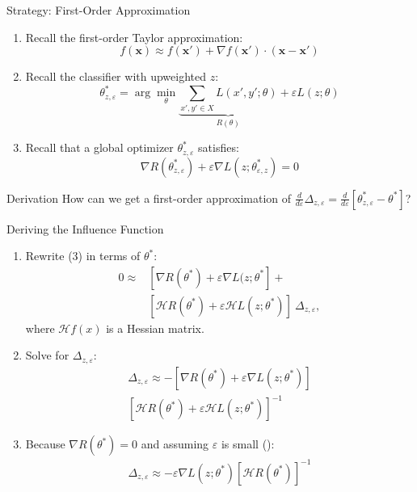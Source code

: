 \documentclass[10pt]{beamer}
\newcommand{\hessian}{\mathcal{H}\xspace}
\begin{document}
\begin{frame}[fragile]{Strategy: First-Order Approximation}

  \begin{enumerate}[<+-| alert@+>]
    \item Recall the first-order Taylor approximation:
      \[
        f(\mathbf{x}) \approx f(\mathbf{x}') + \nabla f(\mathbf{x}') \cdot (\mathbf{x} - \mathbf{x'})
      \]
    \item Recall the classifier with upweighted $z$:
      \[
        \theta^*_{z, \varepsilon} = \arg \min_\theta \underbrace{\sum_{x', y' \in X} L(x', y';
        \theta)}_{R(\theta)} + \varepsilon L(z; \theta)
      \]
    \item Recall that a global optimizer $\theta^*_{z, \varepsilon}$ satisfies:
      \[
        \nabla R(\theta^*_{z, \varepsilon}) + \varepsilon \nabla L(z; \theta^*_{\varepsilon, z}) = 0
      \]
  \end{enumerate}

  \pause
  \begin{alertblock}{Derivation}
    How can we get a first-order approximation of
      $\frac{d}{d\varepsilon} \Delta_{z, \varepsilon} = \frac{d}{d\varepsilon} [\theta^*_{z,
      \varepsilon} - \theta^*]$?
  \end{alertblock}

\end{frame}


\begin{frame}[fragile]{Deriving the Influence Function}

  \begin{enumerate}[<+-| alert@+>]
    \item Rewrite (3) in terms of $\theta^*$:
      \[
        \begin{aligned}
          0 \approx & [\nabla R(\theta^*) + \varepsilon \nabla L(z; \theta^*] + \\
          & [\hessian R(\theta^*) + \varepsilon \hessian L(z; \theta^*)]\ \Delta_{z, \varepsilon},
        \end{aligned}
      \]
      where $\hessian f(x)$ is a Hessian matrix.
    \item Solve for $\Delta_{z, \varepsilon}$:
      \[
        \begin{aligned}
          \Delta_{z, \varepsilon} \approx -[\nabla R(\theta^*) + \varepsilon \nabla L(z; \theta^*)] \\
            [\hessian R(\theta^*) + \varepsilon \hessian L(z; \theta^*)]^{-1}
        \end{aligned}
      \]
    \item Because $\nabla R(\theta^*) = 0$ and assuming $\varepsilon$ is small (\cite{KohL17}):
      \[
        \begin{aligned}
          \Delta_{z, \varepsilon} \approx -\varepsilon \nabla L(z; \theta^*) [\hessian R(\theta^*)]^{-1}
        \end{aligned}
      \]
  \end{enumerate}

\end{frame}
\end{document}
